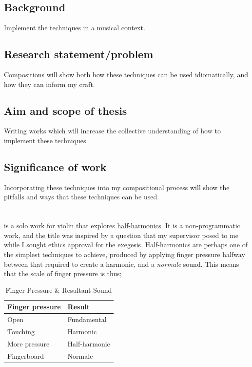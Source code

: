 \subsection{Background}
Implement the techniques in a musical context.
\subsection{Research statement/problem}
Compositions will show both how these techniques can be used idiomatically, and how they can inform my craft.
\subsection{Aim and scope of thesis}
Writing works which will increase the collective understanding of how to implement these techniques.
\subsection{Significance of work}
Incorporating these techniques into my compositional process will show the pitfalls and ways that these techniques can be used.

\section{\violinPiece} \label{sec:violinPiece}
\violinPiece is a solo work for violin that explores \hyperref[sec:halfHarmonicsDiscussion]{half-harmonics}.
It is a non-programmatic work, and the title was inspired by a question that my supervisor posed to me while I sought ethics approval for the exegesis.
Half-harmonics are perhaps one of the simplest techniques to achieve, produced by applying finger pressure halfway between that required to create a harmonic, and a \emph{normale} sound.
This means that the scale of finger pressure is thus;

\begin{table}[]
    \centering
    \caption{Finger Pressure \& Resultant Sound}
    \label{tab:finger-pressure}
    \begin{tabular}{@{}ll@{}}
    \toprule
    Finger pressure & Result        \\ \midrule
    Open            & Fundamental   \\
    Touching        & Harmonic      \\
    More pressure   & Half-harmonic \\
    Fingerboard     & Normale       \\ \bottomrule
    \end{tabular}%
    \end{table}

